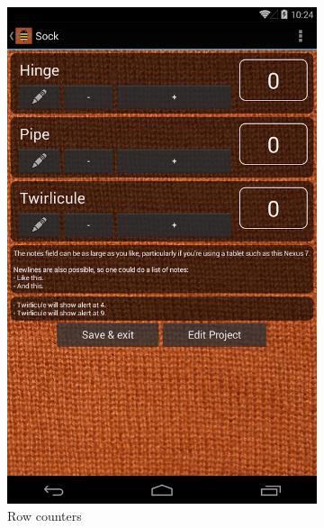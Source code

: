 \begin{figure}[H]
  \centering
    \begin{subfigure}[b]{0.33\textwidth}
      \centering
        \includegraphics[width=0.95\linewidth]{images/image01.png}
        \caption[Row counters ]{Row counters}
      \label{fig:knit_tink_row_counter}
    \end{subfigure}
    \begin{subfigure}[b]{0.33\textwidth}
      \centering

\end{subfigure}
\end{figure}
